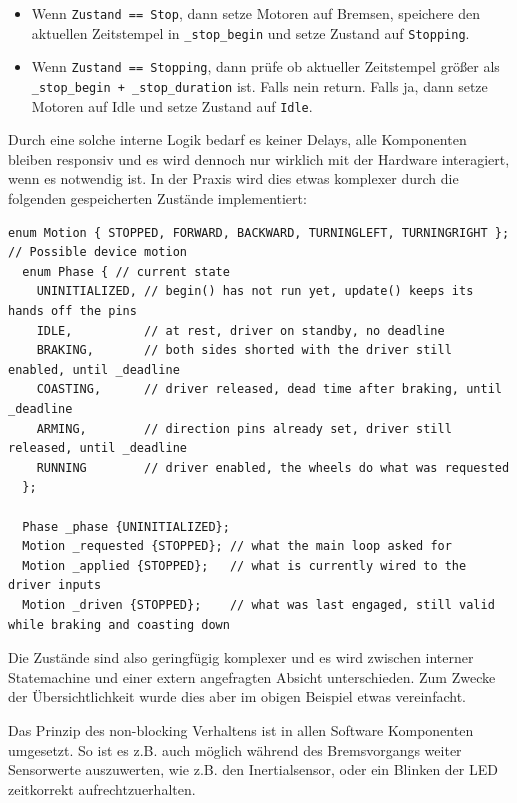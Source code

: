 \documentclass[
  a4paper,
  12pt,
  DIV=12,        %
  parskip=half,  %
  headings=small %
]{scrartcl}
\theoremstyle{definition}
\theoremstyle{definition}
\begin{document}
\begin{itemize}
	\item Wenn \texttt{Zustand == Stop}, dann setze Motoren auf Bremsen, speichere den aktuellen Zeitstempel in \texttt{\_stop\_begin} und setze Zustand auf \texttt{Stopping}.
	\item Wenn \texttt{Zustand == Stopping}, dann prüfe ob aktueller Zeitstempel größer als \texttt{\_stop\_begin + \_stop\_duration} ist. Falls nein return. Falls ja, dann setze Motoren auf Idle und setze Zustand auf \texttt{Idle}.
\end{itemize}

Durch eine solche interne Logik bedarf es keiner Delays, alle Komponenten bleiben responsiv und es wird dennoch nur wirklich mit der Hardware interagiert, wenn es notwendig ist. In der Praxis wird dies etwas komplexer durch die folgenden gespeicherten Zustände implementiert:

\begin{lstlisting}[style=cpp]
enum Motion { STOPPED, FORWARD, BACKWARD, TURNINGLEFT, TURNINGRIGHT }; // Possible device motion
  enum Phase { // current state
    UNINITIALIZED, // begin() has not run yet, update() keeps its hands off the pins
    IDLE,          // at rest, driver on standby, no deadline
    BRAKING,       // both sides shorted with the driver still enabled, until _deadline
    COASTING,      // driver released, dead time after braking, until _deadline
    ARMING,        // direction pins already set, driver still released, until _deadline
    RUNNING        // driver enabled, the wheels do what was requested
  };

  Phase _phase {UNINITIALIZED};
  Motion _requested {STOPPED}; // what the main loop asked for
  Motion _applied {STOPPED};   // what is currently wired to the driver inputs
  Motion _driven {STOPPED};    // what was last engaged, still valid while braking and coasting down
\end{lstlisting}

Die Zustände sind also geringfügig komplexer und es wird zwischen interner Statemachine und einer extern angefragten Absicht unterschieden. Zum Zwecke der Übersichtlichkeit wurde dies aber im obigen Beispiel etwas vereinfacht.

Das Prinzip des non-blocking Verhaltens ist in allen Software Komponenten umgesetzt. So ist es z.B. auch möglich während des Bremsvorgangs weiter Sensorwerte auszuwerten, wie z.B. den Inertialsensor, oder ein Blinken der LED zeitkorrekt aufrechtzuerhalten.
\end{document}
